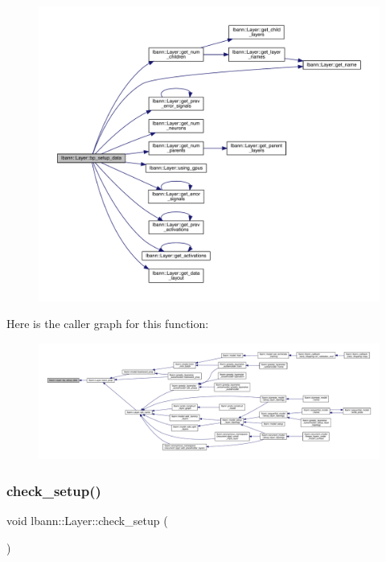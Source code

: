 \begin{figure}[H]
\begin{center}
\leavevmode
\includegraphics[width=350pt]{classlbann_1_1Layer_af7312710c0b9ac6ebe327d0ffe22cbf0_cgraph}
\end{center}
\end{figure}
Here is the caller graph for this function\+:\nopagebreak
\begin{figure}[H]
\begin{center}
\leavevmode
\includegraphics[width=350pt]{classlbann_1_1Layer_af7312710c0b9ac6ebe327d0ffe22cbf0_icgraph}
\end{center}
\end{figure}
\mbox{\label{classlbann_1_1Layer_aeec1c710c3d53b5e43a4d4f67b0a21b2}} 
\subsubsection{\texorpdfstring{check\+\_\+setup()}{check\_setup()}}
{\footnotesize\ttfamily void lbann\+::\+Layer\+::check\+\_\+setup (\begin{DoxyParamCaption}{ }\end{DoxyParamCaption})\hspace{0.3cm}{\ttfamily [virtual]}}


